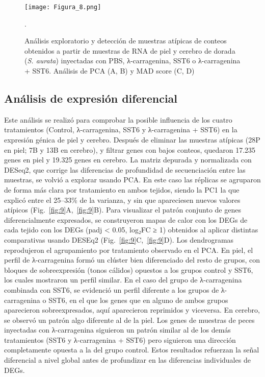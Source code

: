 \documentclass[10pt,a4paper]{article}
\begin{document}
\begin{figure}[ht]
  \centering
 \texttt{[image: Figura\_8.png]}
 
  \caption{Análisis exploratorio y detección de muestras atípicas de conteos obtenidos a partir de muestras de RNA de piel y cerebro de dorada (\textit{S. aurata}) inyectadas con PBS, λ-carragenina, SST6 o λ-carragenina + SST6. Análisis de PCA (A, B) y MAD score (C, D)}.
  \label{fig:8}
\end{figure}

\subsection{Análisis de expresión diferencial}
Este análisis se realizó para comprobar la posible influencia de los cuatro tratamientos (Control, λ-carragenina, SST6 y λ-carragenina + SST6) en la expresión génica de piel y cerebro. Después de eliminar las muestras atípicas (28P en piel; 7B y 13B en cerebro), y filtrar genes con bajos conteos, quedaron 17.235 genes en piel y 19.325 genes en cerebro. La matriz depurada y normalizada con DESeq2, que corrige las diferencias de profundidad de secuenciación entre las muestras, se volvió a explorar usando PCA. En este caso las réplicas se agruparon de forma más clara por tratamiento en ambos tejidos, siendo la PC1 la que explicó entre el 25–33\% de la varianza, y sin que apareciesen nuevos valores atípicos (Fig.~\ref{fig:9}A,~\ref{fig:9}B). Para visualizar el patrón conjunto de genes diferencialmente expresados, se construyeron mapas de calor con los DEGs de cada tejido con los DEGs (padj < 0.05, log₂FC ≥ 1) obtenidos al aplicar distintas comparativas usando DESEq2 (Fig.~\ref{fig:9}C,~\ref{fig:9}D). Los dendrogramas reprodujeron el agrupamiento por tratamiento observado en el PCA. En piel, el perfil de λ-carragenina formó un clúster bien diferenciado del resto de grupos, con bloques de sobreexpresión (tonos cálidos) opuestos a los grupos control y SST6, los cuales mostraron un perfil similar. En el caso del grupo de λ-carragenina combinada con SST6, se evidenció un perfil diferente a los grupos de λ-carragenina o SST6, en el que los genes que en alguno de ambos grupos aparecieron sobreexpresados, aquí aparecieron reprimidos y viceversa. En cerebro, se observó un patrón algo diferente al de la piel. Los genes de muestras de peces inyectadas con λ-carragenina siguieron un patrón similar al de los demás tratamientos (SST6 y λ-carragenina + SST6) pero siguieron una dirección completamente opuesta a la del grupo control. Estos resultados refuerzan la señal diferencial a nivel global antes de profundizar en las diferencias individuales de DEGs. 
\end{document}
